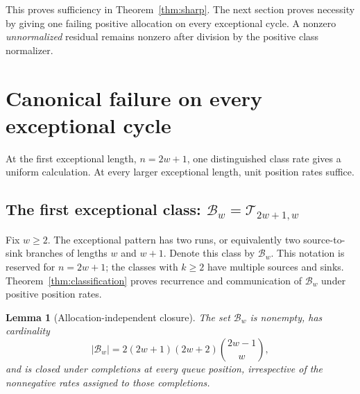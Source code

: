 \documentclass[11pt]{article}
\newtheorem{lemma}[theorem]{Lemma}
\theoremstyle{remark}
\newcommand{\B}{\mathcal B_w}
\begin{document}
This proves sufficiency in Theorem~\ref{thm:sharp}. The next section proves necessity by giving one failing positive allocation on every exceptional cycle. A nonzero \emph{unnormalized} residual remains nonzero after division by the positive class normalizer.

\section{Canonical failure on every exceptional cycle}\label{sec:failures}
At the first exceptional length, $n=2w+1$, one distinguished class rate gives a uniform calculation. At every larger exceptional length, unit position rates suffice.

\subsection{The first exceptional class: \texorpdfstring{$\mathcal B_w=\mathcal T_{2w+1,w}$}{the balanced family}}\label{sec:balanced}
Fix $w\ge2$. The exceptional pattern has two runs, or equivalently two source-to-sink branches of lengths $w$ and $w+1$. Denote this class by $\B$. This notation is reserved for $n=2w+1$; the classes with $k\ge2$ have multiple sources and sinks. Theorem~\ref{thm:classification} proves recurrence and communication of $\B$ under positive position rates.
\begin{lemma}[Allocation-independent closure]\label{lem:closure}
The set $\B$ is nonempty, has cardinality
\begin{equation}\label{eq:size}
 |\B|=2(2w+1)(2w+2)\binom{2w-1}{w},
\end{equation}
and is closed under completions at every queue position, irrespective of the nonnegative rates assigned to those completions.
\end{lemma}
\end{document}
